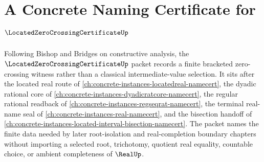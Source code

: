 \chapter{A Concrete Naming Certificate for $\LocatedZeroCrossingCertificateUp$}
\label{ch:concrete-instances-located-zero-crossing-certificate-namecert}

Following Bishop and Bridges on constructive analysis, the $\LocatedZeroCrossingCertificateUp$ packet records a finite bracketed zero-crossing witness rather than a classical intermediate-value selection. It sits after the located real route of \autoref{ch:concrete-instances-locatedreal-namecert}, the dyadic rational core of \autoref{ch:concrete-instances-dyadicratcore-namecert}, the regular rational readback of \autoref{ch:concrete-instances-regseqrat-namecert}, the terminal real-name seal of \autoref{ch:concrete-instances-real-namecert}, and the bisection handoff of \autoref{ch:concrete-instances-located-interval-bisection-namecert}. The packet names the finite data needed by later root-isolation and real-completion boundary chapters without importing a selected root, trichotomy, quotient real equality, countable choice, or ambient completeness of $\RealUp$.

